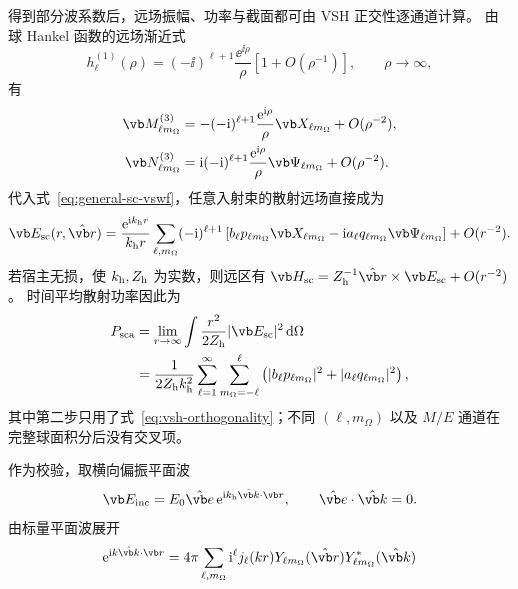 得到部分波系数后，远场振幅、功率与截面都可由 VSH 正交性逐通道计算。
由球 Hankel 函数的远场渐近式
\begin{equation}
h_\ell^{(1)}(\rho)
= (-\ii)^{\ell+1}\frac{\ee^{\ii\rho}}{\rho}
\left[1+O(\rho^{-1})\right],
\qquad \rho\to\infty,
\end{equation}
有
\begin{align}
\vb M_{\ell m_{\Omega}}^{(3)}
&=-(-\ii)^{\ell+1}
\frac{\ee^{\ii\rho}}{\rho}
\vb X_{\ell m_{\Omega}}+O(\rho^{-2}),
\\
\vb N_{\ell m_{\Omega}}^{(3)}
&=\ii(-\ii)^{\ell+1}
\frac{\ee^{\ii\rho}}{\rho}
\vb\Psi_{\ell m_{\Omega}}+O(\rho^{-2}).
\end{align}
代入式~\cref{eq:general-sc-vswf}，任意入射束的散射远场直接成为
\begin{equation}
{
\vb E_{\rm sc}(r,\hat{\vb r})
=\frac{\ee^{\ii k_{\rm h}r}}{k_{\rm h}r}
\sum_{\ell,m_{\Omega}}(-\ii)^{\ell+1}
\left[
 b_\ell p_{\ell m_{\Omega}}\vb X_{\ell m_{\Omega}}
-\ii a_\ell q_{\ell m_{\Omega}}\vb\Psi_{\ell m_{\Omega}}
\right]
+O(r^{-2}).}
\label{eq:mie-general-far-field}
\end{equation}
若宿主无损，使 $k_{\rm h},Z_{\rm h}$ 为实数，则远区有
$\vb H_{\rm sc}=Z_{\rm h}^{-1}\hat{\vb r}\times\vb E_{\rm sc}+O(r^{-2})$。
时间平均散射功率因此为
\begin{align}
P_{\rm sca}
&=\lim_{r\to\infty}
\int \frac{r^2}{2Z_{\rm h}}
|\vb E_{\rm sc}|^2\,\dd\Omega
\\
&=\frac{1}{2Z_{\rm h}k_{\rm h}^2}
\sum_{\ell=1}^{\infty}
\sum_{m_{\Omega}=-\ell}^{\ell}
\left(
|b_\ell p_{\ell m_{\Omega}}|^2
+|a_\ell q_{\ell m_{\Omega}}|^2
\right),
\label{eq:mie-arbitrary-beam-scattered-power}
\end{align}
其中第二步只用了式~\cref{eq:vsh-orthogonality}；不同
$(\ell,m_{\Omega})$ 以及 $M/E$ 通道在完整球面积分后没有交叉项。

作为校验，取横向偏振平面波
\begin{equation}
\vb E_{\rm inc}
=E_0\hat{\vb e}\,
\ee^{\ii k_{\rm h}\hat{\vb k}\cdot\vb r},
\qquad
\hat{\vb e}\cdot\hat{\vb k}=0.
\end{equation}
由标量平面波展开
\begin{equation}
\ee^{\ii k\hat{\vb k}\cdot\vb r}
=4\pi\sum_{\ell,m_{\Omega}}
\ii^\ell j_\ell(kr)
Y_{\ell m_{\Omega}}(\hat{\vb r})
Y_{\ell m_{\Omega}}^*(\hat{\vb k})
\end{equation}


